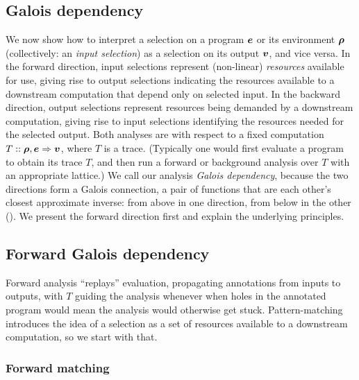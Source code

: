 \subsection{Galois dependency}
\label{sec:data-dependencies:analyses}

We now show how to interpret a selection on a program $\bm{e}$ or its environment $\bm{\rho}$ (collectively: an \emph{input selection}) as a selection on its output $\bm{v}$, and vice versa. In the forward direction, input selections represent (non-linear) \emph{resources} available for use, giving rise to output selections indicating the resources available to a downstream computation that depend only on selected input. In the backward direction, output selections represent resources being demanded by a downstream computation, giving rise to input selections identifying the resources needed for the selected output. Both analyses are with respect to a fixed computation $T :: \bm{\rho}, \bm{e} \Rightarrow \bm{v}$, where $T$ is a trace. (Typically one would first evaluate a program to obtain its trace $T$, and then run a forward or background analysis over $T$ with an appropriate lattice.) We call our analysis \emph{Galois dependency}, because the two directions form a Galois connection, a pair of functions that are each other's closest approximate inverse: from above in one direction, from below in the other ().  We present the forward direction first and explain the underlying principles.

\subsection{Forward Galois dependency}
\label{sec:data-dependencies:analyses:fwd}

Forward analysis ``replays'' evaluation, propagating annotations from inputs to outputs, with $T$ guiding the analysis whenever when holes in the annotated program would mean the analysis would otherwise get stuck. Pattern-matching introduces the idea of a selection as a set of resources available to a downstream computation, so we start with that.



\subsubsection{Forward matching}
\label{sec:data-dependencies:analyses:fwd:pattern-match}

